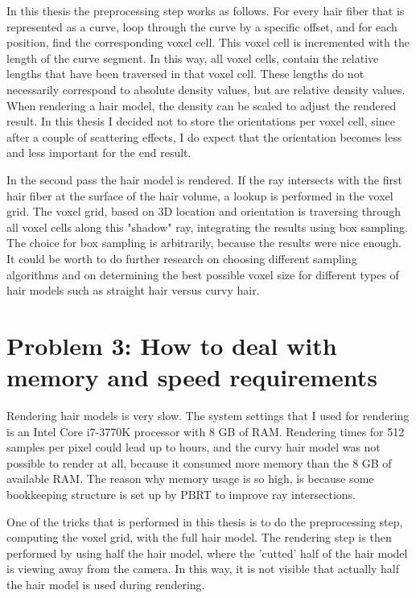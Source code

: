 \documentclass[11pt,a4paper]{report}
\begin{document}
In this thesis the preprocessing step works as follows. For every hair fiber that is represented as a curve, loop through the curve by a specific offset, and for each position, find the corresponding voxel cell. This voxel cell is incremented with the length of the curve segment. In this way, all voxel cells, contain the relative lengths that have been traversed in that voxel cell. These lengths do not necessarily correspond to absolute density values, but are relative density values. When rendering a hair model, the density can be scaled to adjust the rendered result. In this thesis I decided not to store the orientations per voxel cell, since after a couple of scattering effects, I do expect that the orientation becomes less and less important for the end result.

In the second pass the hair model is rendered. If the ray intersects with the first hair fiber at the surface of the hair volume, a lookup is performed in the voxel grid. The voxel grid, based on 3D location and orientation is traversing through all voxel cells along this "shadow" ray, integrating the results using box sampling. The choice for box sampling is arbitrarily, because the results were nice enough. It could be worth to do further research on choosing different sampling algorithms and on determining the best possible voxel size for different types of hair models such as straight hair versus curvy hair.

\section{Problem 3: How to deal with memory and speed requirements}

Rendering hair models is very slow. The system settings that I used for rendering is an Intel Core i7-3770K processor with 8 GB of RAM. Rendering times for 512 samples per pixel could lead up to hours, and the curvy hair model was not possible to render at all, because it consumed more memory than the 8 GB of available RAM. The reason why memory usage is so high, is because some bookkeeping structure is set up by PBRT to improve ray intersections.

One of the tricks that is performed in this thesis is to do the preprocessing step, computing the voxel grid, with the full hair model. The rendering step is then performed by using half the hair model, where the 'cutted' half of the hair model is viewing away from the camera. In this way, it is not visible that actually half the hair model is used during rendering.
\end{document}
